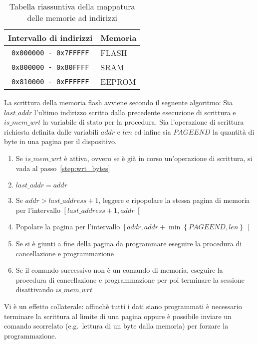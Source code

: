 \begin{table}[h]
    \centering
    \begin{tabular}{ c l }
        \textbf{Intervallo di indirizzi} & \textbf{Memoria} \\
        \hline%
        \texttt{0x000000 - 0x7FFFFF} & FLASH \\
        \texttt{0x800000 - 0x80FFFF} & SRAM\\
        \texttt{0x810000 - 0xFFFFFF} & EEPROM\\
        \hline%
    \end{tabular}
    \caption[]{Tabella riassuntiva della mappatura delle memorie ad indirizzi\cite{site:gdb}}\label{tab:gdb-mem-addr}
\end{table}

La scrittura della memoria flash avviene secondo il seguente algoritmo:
Sia \(last\_addr\) l'ultimo indirizzo scritto dalla precedente esecuzione di scrittura e \(is\_mem\_wrt\) la variabile di stato per la procedura.
Sia l'operazione di scrittura richiesta definita dalle variabili \(addr\) e \(len\) ed infine sia \(PAGEEND\) la quantità di byte in una pagina per il dispositivo.
\begin{enumerate}
    \item Se \(is\_mem\_wrt\) è attiva, ovvero se è già in corso un'operazione di scrittura, si vada al passo~\ref{step:wrt_bytes}
    \item \(last\_addr = addr\)
    \item\label{step:wrt_bytes} Se \(addr > last\_address + 1\), leggere e ripopolare la stessa pagina di memoria per l'intervallo \(\left[last\_address + 1, addr\right[\)
    \item Popolare la pagina per l'intervallo \(\left[addr, addr + \min\left\{PAGEEND, len\right\}\right[ \)
    \item Se si è giunti a fine della pagina da programmare eseguire la procedura di cancellazione e programmazione
    \item Se il comando successivo non è un comando di memoria, eseguire la procedura di cancellazione e programmazione per poi terminare la sessione disattivando \(is\_mem\_wrt\)
\end{enumerate}

Vi è un effetto collaterale: affinchè tutti i dati siano programmati è necessario terminare la scrittura al limite di una pagina oppure è possibile inviare un comando scorrelato (e.g.\ lettura di un byte dalla memoria) per forzare la programmazione.

